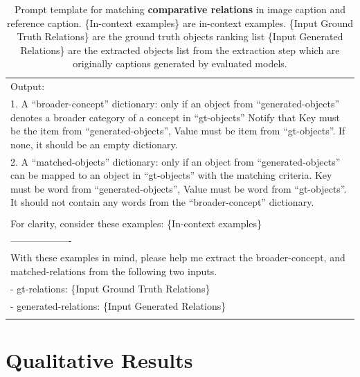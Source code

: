 \begin{table}[h!]
\begin{minipage}{0.95\textwidth}
\begin{tcolorbox}
\begin{tabular}{p{}}
        Output: \\
        1. A ``broader-concept'' dictionary: only if an object from ``generated-objects'' denotes a broader category of a concept in ``gt-objects'' Notify that Key must be the item from ``generated-objects'', Value must be item from ``gt-objects''. If none, it should be an empty dictionary. \\
        2. A ``matched-objects'' dictionary: only if an object from ``generated-objects'' can be mapped to an object in ``gt-objects'' with the matching criteria. Key must be word from ``generated-objects'', Value must be word from ``gt-objects''. It should not contain any words from the ``broader-concept'' dictionary.\\\\

        For clarity, consider these examples: \textcolor[rgb]{0,0.7,0}{ \{In-context examples\} } \\
------------------- \\
        With these examples in mind, please help me extract the broader-concept, and matched-relations from the following two inputs. \\ 
        - gt-relations: \textcolor[rgb]{0.8,0,0}{\{Input Ground Truth Relations\}}  \\
        - generated-relations: \textcolor[rgb]{0.8,0,0}{\{Input Generated Relations\}} \\
\\

    \end{tabular}
\end{tcolorbox}
\caption{Prompt template for matching \textbf{comparative relations} in image caption and reference caption.
\textcolor[rgb]{0,0.7,0}{ \{In-context examples\} } are in-context examples. \textcolor[rgb]{0.8,0,0}{\{Input Ground Truth Relations\}} are the ground truth objects ranking list
\textcolor[rgb]{0.8,0,0}{\{Input Generated Relations\}} are the extracted objects list from the extraction step which are originally captions generated by evaluated models.}
    \label{tab:matching_comparative}
\end{minipage}
\end{table}

\section{Qualitative Results}
\label{apx:qualitative_results}

